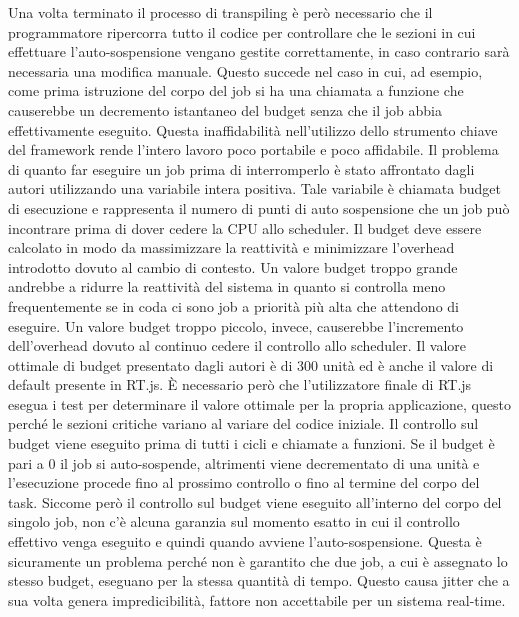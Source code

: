 \documentclass[conference]{IEEEtran}
\begin{document}
\newline
Una volta terminato il processo di transpiling è però necessario che il programmatore ripercorra tutto il codice per controllare che le sezioni in cui effettuare l'auto-sospensione vengano gestite correttamente, in caso contrario sarà necessaria una modifica manuale. Questo succede nel caso in cui, ad esempio, come prima istruzione del corpo del job si ha una chiamata a funzione che causerebbe un decremento istantaneo del budget senza che il job abbia effettivamente eseguito. Questa inaffidabilità nell'utilizzo dello strumento chiave del framework rende l'intero lavoro poco portabile e poco affidabile. 
\newline
Il problema di quanto far eseguire un job prima di interromperlo è stato affrontato dagli autori utilizzando una variabile intera positiva. Tale variabile è chiamata budget di esecuzione e rappresenta il numero di punti di auto sospensione che un job
può incontrare prima di dover cedere la CPU allo scheduler. Il budget deve essere calcolato in modo da massimizzare la reattività e minimizzare l'overhead introdotto dovuto al cambio di contesto. Un valore budget troppo grande andrebbe a ridurre la reattività del sistema in quanto si controlla meno frequentemente se in coda ci sono job a priorità più alta che attendono di eseguire. Un valore budget troppo piccolo, invece, causerebbe l'incremento dell'overhead dovuto al continuo cedere il controllo allo scheduler. Il valore ottimale di budget presentato dagli autori è di 300 unità ed è anche il valore di default presente in RT.js. È necessario però che l'utilizzatore finale di RT.js esegua i test per determinare il valore ottimale per la propria applicazione, questo perché le sezioni critiche variano al variare del codice iniziale.
\newline
Il controllo sul budget viene eseguito prima di tutti i cicli e chiamate a funzioni. Se il budget è pari a 0 il job si auto-sospende, altrimenti viene decrementato di una unità e l'esecuzione procede fino al prossimo controllo o fino al termine del corpo del task. Siccome però il controllo sul budget viene eseguito all'interno del corpo del singolo job, non c'è alcuna garanzia sul momento esatto in cui il controllo effettivo venga eseguito e quindi quando avviene l'auto-sospensione. Questa è sicuramente un problema perché non è garantito che due job, a cui è assegnato lo stesso budget, eseguano per la stessa quantità di tempo. Questo causa jitter che a sua volta genera impredicibilità, fattore non accettabile per un sistema real-time.
\newline
\end{document}
